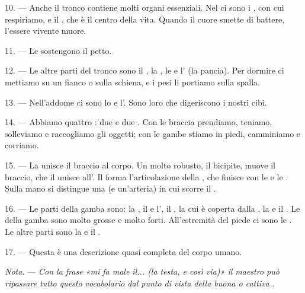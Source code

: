 10. --- Anche il tronco contiene molti organi essenziali. Nel  ci sono i
, con cui respiriamo, e il , che è il centro della vita.
Quando il cuore smette di battere, l'essere vivente muore.

11. --- Le  sostengono il petto.

12. --- Le altre parti del tronco sono il , la , le
 e l' (la pancia). Per dormire ci mettiamo su un fianco
o sulla schiena, e i pesi li portiamo sulla spalla.

13. --- Nell'addome ci sono lo  e l'. Sono loro che
digeriscono i nostri cibi.

\VUsaut{4.4mm}
\VUsaut{3.0mm}

14. --- Abbiamo quattro : due  e due . Con
le braccia prendiamo, teniamo, solleviamo e raccogliamo gli oggetti; con le gambe
stiamo in piedi, camminiamo e corriamo.

15. --- La  unisce il braccio al corpo. Un  molto
robusto, il bicipite, muove il braccio, che il  unisce
all'. Il  forma l'articolazione della
, che finisce con le  e le . Sulla mano si
distingue una  (e un'arteria) in cui scorre il .

16. --- Le parti della gamba sono: la , il  e
l', il , la cui  è
coperta dalla , la  e il . Le
 della gamba sono molto grosse e molto forti. All'estremità del piede ci
sono le . Le altre parti sono la  e il .

17. --- Questa è una descrizione quasi completa del corpo umano.

\textit{Nota.} --- \textit{Con la frase «mi fa male il... (la testa, e così via)» il
maestro può ripassare tutto questo vocabolario dal punto di vista della buona o
cattiva} .

\VUsaut{5.0mm}
\VUsaut{2.4mm}
\VUsaut{3.0mm}

